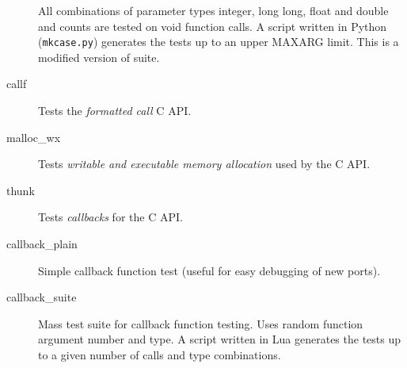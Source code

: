 \begin{description}
All combinations of parameter types integer, long long, float and double and
counts are tested on void function calls.
A script written in Python ({\tt mkcase.py}) generates the tests up to
an upper MAXARG limit.
This is a modified version of suite.

\item [callf]

Tests the \emph{formatted call}  C API.

\item [malloc\_wx]

Tests \emph{writable and executable memory allocation} used by the  C API.

\item [thunk]

Tests \emph{callbacks} for the  C API.

\item [callback\_plain]
Simple callback function test (useful for easy debugging of new ports).

\item [callback\_suite]
Mass test suite for callback function testing. Uses random function argument number and type.
A script written in Lua generates the tests up to a given number of calls and type combinations.

\end{description}

